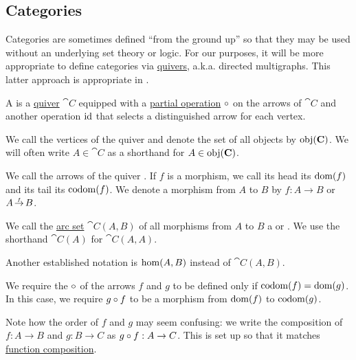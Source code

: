 \subsection{Categories}\label{subsec:categories}

Categories are sometimes defined \enquote{from the ground up} so that they may be used without an underlying set theory or logic. For our purposes, it will be more appropriate to define categories via \hyperref[def:graph/quiver]{quivers}, a.k.a. directed multigraphs. This latter approach is appropriate in \hyperref[def:axiom_of_universes]{}.

\begin{definition}\label{def:category}
  A  is a \hyperref[def:graph/quiver]{quiver} \( \cat{C} \) equipped with a \hyperref[def:partial_function]{partial operation} \( \mathbin \circ \) on the arrows of \( \cat{C} \) and another operation \( \operatorname{id} \) that selects a distinguished arrow for each vertex.

  \begin{thmenum}[series=def:category]
     We call the vertices of the quiver  and denote the set of all objects by \( \operatorname{obj}(\operatorname{\mathbf{C}}) \). We will often write \( A \in \cat{C} \) as a shorthand for \( A \in \operatorname{obj}(\operatorname{\mathbf{C}}) \).

     We call the arrows of the quiver . If \( f \) is a morphism, we call its head its  \( \operatorname{dom}(f) \) and its tail its  \( \operatorname*{co\negthinspace\operatorname{dom}}(f) \). We denote a morphism from \( A \) to \( B \) by \( f: A \to B \) or \( A \reloset f \to B \).

    We call the \hyperref[eq:def:graph/quiver/arc_set]{arc set} \( \cat{C}(A, B) \) of all morphisms from \( A \) to \( B \) a  or . We use the shorthand \( \cat{C}(A) \) for \( \cat{C}(A, A) \).

    Another established notation is \( \operatorname{hom}(A, B) \) instead of \( \cat{C}(A, B) \).

     We require the  \( \mathbin \circ \) of the arrows \( f \) and \( g \) to be defined only if \( \operatorname*{co\negthinspace\operatorname{dom}}(f) = \operatorname{dom}(g) \). In this case, we require \( g \mathbin \circ f \) to be a morphism from \( \operatorname{dom}(f) \) to \( \operatorname*{co\negthinspace\operatorname{dom}}(g) \).

    Note how the order of \( f \) and \( g \) may seem confusing: we write the composition of \( f: A \to B \) and \( g: B \to C \) as \( g \mathbin \circ f: A \to C \). This is set up so that it matches \hyperref[def:multi_valued_function/composition]{function composition}.


\end{thmenum}
\end{definition}

